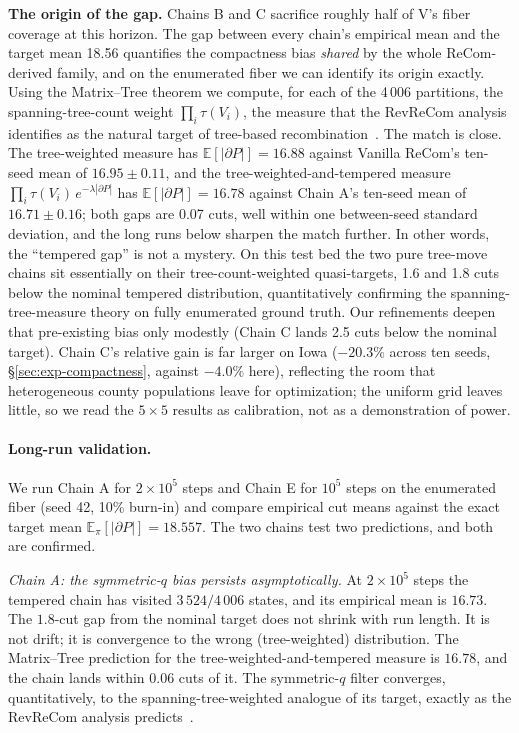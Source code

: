 \documentclass[11pt]{article}
\newcommand{\E}{\mathbb{E}}
\begin{document}
\textbf{The origin of the gap.} Chains B and C
sacrifice roughly half of V's fiber coverage at this horizon. The
gap between every chain's empirical mean and the target mean 18.56
quantifies the compactness bias \emph{shared} by the whole
ReCom-derived family, and on the enumerated fiber we can identify its
origin exactly. Using the Matrix--Tree theorem we compute, for each
of the 4\,006 partitions, the spanning-tree-count weight
$\prod_i \tau(V_i)$, the measure that the RevReCom analysis
identifies as the natural target of tree-based
recombination~\cite{cannon2022spanning,autry2023metropolized}. The
match is close. The tree-weighted measure has
$\E[|\partial P|] = 16.88$ against Vanilla ReCom's ten-seed mean of
$16.95 \pm 0.11$, and the tree-weighted-and-tempered measure
$\prod_i \tau(V_i)\, e^{-\lambda|\partial P|}$ has
$\E[|\partial P|] = 16.78$ against Chain A's ten-seed mean of
$16.71 \pm 0.16$; both gaps are 0.07 cuts, well within one
between-seed standard deviation, and the long runs below sharpen the
match further. In
other words, the ``tempered gap'' is not a mystery. On this test bed
the two pure tree-move chains sit essentially on their
tree-count-weighted quasi-targets, 1.6 and 1.8 cuts below the nominal
tempered distribution, quantitatively confirming the
spanning-tree-measure theory on fully enumerated ground truth. Our
refinements deepen that pre-existing bias only modestly (Chain C
lands 2.5 cuts below the nominal target). Chain C's relative gain is
far larger on Iowa ($-20.3\%$ across ten seeds,
\S\ref{sec:exp-compactness}, against $-4.0\%$ here), reflecting the
room that heterogeneous county populations leave for optimization;
the uniform grid leaves little, so we read the $5 \times 5$ results
as calibration, not as a demonstration of power.

\paragraph{Long-run validation.}\label{sec:exp-longrun}
We run Chain A for $2 \times 10^5$ steps and Chain E for $10^5$ steps
on the enumerated fiber (seed 42, 10\% burn-in) and compare empirical
cut means against the exact target mean
$\E_\pi[|\partial P|] = 18.557$. The two chains test two predictions,
and both are confirmed.

\emph{Chain A: the symmetric-$q$ bias persists asymptotically.} At
$2 \times 10^5$ steps the tempered chain has visited $3\,524/4\,006$
states, and its empirical mean is $16.73$. The $1.8$-cut gap from the
nominal target does not shrink with run length. It is not drift; it is
convergence to the wrong (tree-weighted) distribution. The
Matrix--Tree prediction for the tree-weighted-and-tempered measure is
$16.78$, and the chain lands within $0.06$ cuts of it. The
symmetric-$q$ filter converges, quantitatively, to the
spanning-tree-weighted analogue of its target, exactly as the
RevReCom analysis predicts~\cite{cannon2022spanning}.
\end{document}
